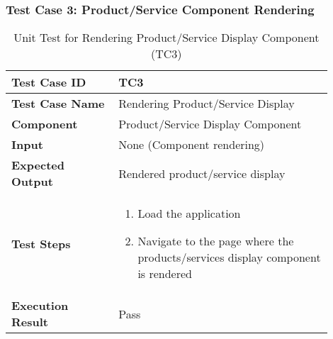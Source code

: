\begin{table}[h]
	\subsubsection{Test Case 3: Product/Service Component Rendering}
	\centering
	\caption{Unit Test for Rendering Product/Service Display Component (TC3)}
	\begin{tabular}{|p{0.3\linewidth}|p{0.6\linewidth}|}
		\hline
		\textbf{Test Case ID} & TC3 \\
		\hline
		\textbf{Test Case Name} & Rendering Product/Service Display \\
		\hline
		\textbf{Component} & Product/Service Display Component \\
		\hline
		\textbf{Input} & None (Component rendering) \\
		\hline
		\textbf{Expected Output} & Rendered product/service display \\
		\hline
		\textbf{Test Steps} & \begin{enumerate}
			\item Load the application 
			\item Navigate to the page where the products/services display component is rendered 
		\end{enumerate} \\
		\hline
		\textbf{Execution Result} & Pass \\
		\hline
	\end{tabular}
\end{table}





